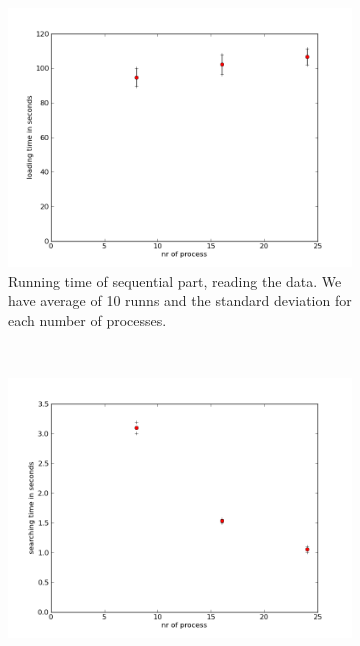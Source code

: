 \documentclass[a4paper,10pt]{article}
\begin{document}
\begin{figure}[h!t]
        \centering
        \begin{subfigure}[b]{0.70\textwidth}
                \centering
                \includegraphics[width=\textwidth]{graphics/mpio17gb/load_time.png}
                \caption{Running time of sequential part, reading the data. 
                         We have average of 10 runns and the standard deviation for each number
                         of processes.}
                \label{fig:mpio_load}
        \end{subfigure}%
        \\
        \begin{subfigure}[b]{0.70\textwidth}
                \centering
                \includegraphics[width=\textwidth]{graphics/mpio17gb/search_time.png}

\end{subfigure}
\end{figure}
\end{document}
